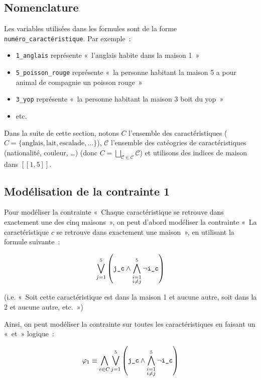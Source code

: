 \subsection{Nomenclature}
Les variables utilisées dans les formules sont de la forme
\verb|numéro_caractéristique|. Par exemple~:
\begin{itemize}
    \item \verb|1_anglais| représente «~l’anglais habite dans la maison
        1~»
    \item \verb|5_poisson_rouge| représente «~la personne habitant la
        maison 5 a pour animal de compagnie un poisson rouge~»
    \item \verb|3_yop| représente «~la personne habitant la maison 3
        boit du yop~»
    \item etc.
\end{itemize}

Dans la suite de cette section, notons $C$ l’ensemble des caractéristiques
($C = \{\text{anglais}, \text{lait}, \text{escalade}, \dots\}$), $\mathscr C$
l’ensemble des catéogries de caractéristiques (nationalité, couleur, …) (donc
$C = \bigsqcup_{\mathcal C \in \mathscr C} \mathcal C$)
et utilisons
des indices de maison dans $[\![1, 5]\!]$.

\subsection{Modélisation de la contrainte 1}
Pour modéliser la contrainte «~Chaque caractéristique se retrouve dans
exactement une des cinq maisons~», on peut d’abord modéliser la contrainte
«~La caractéristique $c$ se retrouve dans exactement une maison~»,
en utilisant la formule suivante~:

\begin{equation*}
    \bigvee_{j = 1}^5 \left(\verb|j_c| \wedge \bigwedge_{\substack{i=1 \\ i \ne j}}^5 \neg \verb|i_c| \right)
\end{equation*}

(i.e. «~Soit cette caractéristique est dans la maison 1 et aucune autre,
soit dans la 2 et aucune autre, etc.~»)

Ainsi, on peut modéliser la contrainte sur toutes les caractéristiques en
faisant un «~et~» logique~:

\begin{equation*}
    \varphi_1 \equiv \bigwedge_{c\in C}\bigvee_{j = 1}^5 \left(\verb|j_c| \wedge \bigwedge_{\substack{i=1 \\ i \ne j}}^5 \neg \verb|i_c| \right)
\end{equation*}


